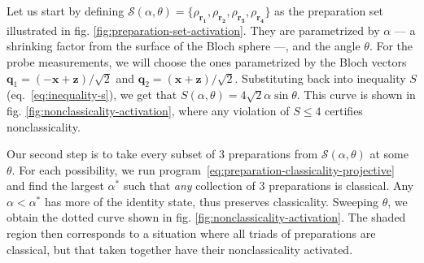             Let us start by defining $\mathcal{S}(\alpha, \theta) = \{ \rho_{\mathbf{r_1}}, \rho_{\mathbf{r_2}}, \rho_{\mathbf{r_3}}, \rho_{\mathbf{r_4}} \}$ as the preparation set illustrated in fig. \ref{fig:preparation-set-activation}. They are parametrized by $\alpha$ --- a shrinking factor from the surface of the Bloch sphere ---, and the angle $\theta$. For the probe measurements, we will choose the ones parametrized by the Bloch vectors $\mathbf{q}_1 = (- \mathbf{x} + \mathbf{z}) / \sqrt{2}$ and  $\mathbf{q}_2 = (\mathbf{x} + \mathbf{z}) / \sqrt{2}$. Substituting back into inequality $S$ (eq.~\eqref{eq:inequality-s}), we get that $S(\alpha, \theta) = 4\sqrt{2} \alpha \sin \theta$. This curve is shown in fig. \ref{fig:nonclassicality-activation}, where any violation of $S \leq 4$ certifies nonclassicality.


            Our second step is to take every subset of $3$ preparations from $\mathcal{S}(\alpha, \theta)$ at some $\theta$. For each possibility, we run program~\eqref{eq:preparation-classicality-projective} and find the largest $\alpha^*$ such that \emph{any} collection of $3$ preparations is classical. Any $\alpha < \alpha^*$ has more of the identity state, thus preserves classicality. Sweeping $\theta$, we obtain the dotted curve shown in fig. \ref{fig:nonclassicality-activation}. The shaded region then corresponds to a situation where all triads of preparations are classical, but that taken together have their nonclassicality activated.


